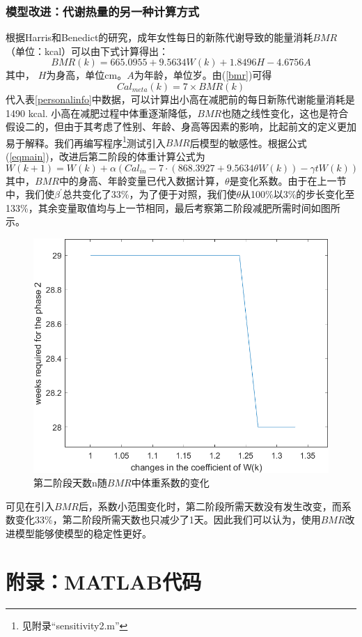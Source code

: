 \documentclass[a4paper,12pt,onecolumn,twoside]{article}
\begin{document}
\subsubsection{模型改进：代谢热量的另一种计算方式}
根据Harris和Benedict的研究\cite{henry2005basal}，成年女性每日的新陈代谢导致的能量消耗$BMR$（单位：kcal）可以由下式计算得出：
\begin{equation}\label{bmr}
	BMR(k)=665.0955+9.5634W(k)+1.8496H-4.6756A
\end{equation}
其中，%
$H$为身高，单位cm。$A$为年龄，单位岁。由(\ref{bmr})可得
\begin{equation}
	Cal_{meta}(k)=7\times BMR(k)
\end{equation}
代入表\ref{personalinfo}中数据，可以计算出小高在减肥前的每日新陈代谢能量消耗是1490 kcal. 小高在减肥过程中体重逐渐降低，$BMR$也随之线性变化，这也是符合假设二的，但由于其考虑了性别、年龄、身高等因素的影响，比起前文的定义更加易于解释。我们再编写程序\footnote{见附录“sensitivity2.m”}测试引入$BMR$后模型的敏感性。根据公式(\ref{eqmain})，改进后第二阶段的体重计算公式为
\begin{equation}
	W(k+1)=W(k)+\alpha(Cal_{in}-7\cdot(868.3927+9.5634\theta W(k))-\gamma tW(k))
\end{equation}
其中，$BMR$中的身高、年龄变量已代入数据计算，$\theta$是变化系数。由于在上一节中，我们使$\beta^{\prime}$总共变化了33\%，为了便于对照，我们使$\theta$从100\%以3\%的步长变化至133\%，其余变量取值均与上一节相同，最后考察第二阶段减肥所需时间如图所示。
\begin{figure}[H]
	\centering
	\includegraphics[width=0.7\linewidth]{res/sensitivity2.png}
	\caption{第二阶段天数n随$BMR$中体重系数的变化}
\end{figure}
可见在引入$BMR$后，系数小范围变化时，第二阶段所需天数没有发生改变，而系数变化33\%，第二阶段所需天数也只减少了1天。因此我们可以认为，使用$BMR$改进模型能够使模型的稳定性更好。


\section{附录：\textbf{MATLAB}代码}





\end{document}
